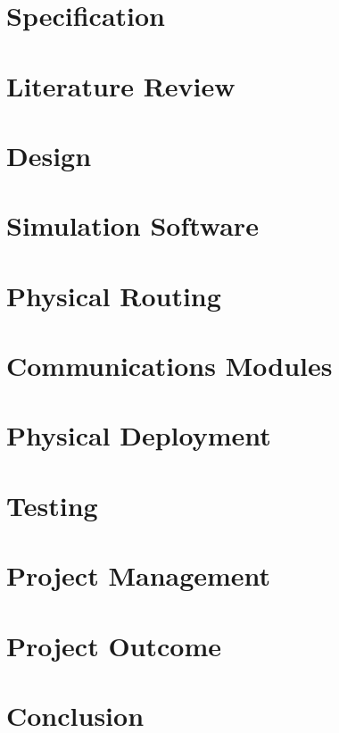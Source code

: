\documentclass[10pt,a4paper,twoside]{report}
\begin{document}
\chapter{Specification}
	

\chapter{Literature Review}
		

\chapter{Design}
	

\chapter{Simulation Software}
	

\chapter{Physical Routing}
	

\chapter{Communications Modules}
	

\chapter{Physical Deployment}
	

\chapter{Testing}
	

\chapter{Project Management}
	

\chapter{Project Outcome}
	

\chapter{Conclusion}
	



\end{document}

